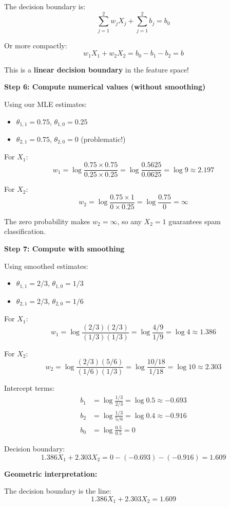 \documentclass[12pt]{article}
\begin{document}
\begin{solution}
The decision boundary is:
\[
\sum_{j=1}^{2} w_j X_j + \sum_{j=1}^{2} b_j = b_0
\]

Or more compactly:
\[
w_1 X_1 + w_2 X_2 = b_0 - b_1 - b_2 = b
\]

This is a \textbf{linear decision boundary} in the feature space!

\textbf{Step 6: Compute numerical values (without smoothing)}

Using our MLE estimates:
\begin{itemize}
    \item $\theta_{1,1} = 0.75$, $\theta_{1,0} = 0.25$
    \item $\theta_{2,1} = 0.75$, $\theta_{2,0} = 0$ (problematic!)
\end{itemize}

For $X_1$:
\[
w_1 = \log \frac{0.75 \times 0.75}{0.25 \times 0.25} = \log \frac{0.5625}{0.0625} = \log 9 \approx 2.197
\]

For $X_2$:
\[
w_2 = \log \frac{0.75 \times 1}{0 \times 0.25} = \log \frac{0.75}{0} = \infty
\]

The zero probability makes $w_2 = \infty$, so any $X_2 = 1$ guarantees spam classification.

\textbf{Step 7: Compute with smoothing}

Using smoothed estimates:
\begin{itemize}
    \item $\theta_{1,1} = 2/3$, $\theta_{1,0} = 1/3$
    \item $\theta_{2,1} = 2/3$, $\theta_{2,0} = 1/6$
\end{itemize}

For $X_1$:
\[
w_1 = \log \frac{(2/3)(2/3)}{(1/3)(1/3)} = \log \frac{4/9}{1/9} = \log 4 \approx 1.386
\]

For $X_2$:
\[
w_2 = \log \frac{(2/3)(5/6)}{(1/6)(1/3)} = \log \frac{10/18}{1/18} = \log 10 \approx 2.303
\]

Intercept terms:
\begin{align}
b_1 &= \log \frac{1/3}{2/3} = \log 0.5 \approx -0.693 \\
b_2 &= \log \frac{1/3}{5/6} = \log 0.4 \approx -0.916 \\
b_0 &= \log \frac{0.5}{0.5} = 0
\end{align}

Decision boundary:
\[
1.386 X_1 + 2.303 X_2 = 0 - (-0.693) - (-0.916) = 1.609
\]

\textbf{Geometric interpretation:}

The decision boundary is the line:
\[
\boxed{1.386 X_1 + 2.303 X_2 = 1.609}
\]


\end{solution}
\end{document}
